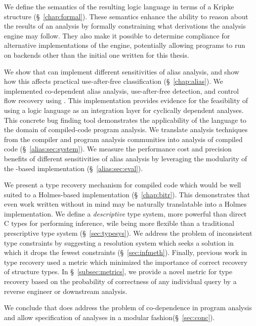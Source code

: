 We define the semantics of the resulting logic language in terms of a Kripke structure (\S~\ref{chap:formal}).
These semantics enhance the ability to reason about the results of an analysis by formally constraining what derivations the analysis engine may follow.
They also make it possible to determine compliance for alternative implementations of the engine, potentially allowing programs to run on backends other than the initial one written for this thesis.

We show that \sysname can implement different sensitivities of alias analysis, and show how this affects practical use-after-free classification (\S~\ref{chap:alias}).
We implemented co-dependent alias analysis, use-after-free detection, and control flow recovery using \sysname.
This implementation provides evidence for the feasibility of using a logic language as an integration layer for cyclically dependent analyses.
This concrete bug finding tool demonstrates the applicability of the \sysname language to the domain of compiled-code program analysis.
We translate analysis techniques from the compiler and program analysis communities into analysis of compiled code (\S~\ref{alias:sec:system}).
We measure the performance cost and precision benefits of different sensitivities of alias analysis by leveraging the modularity of the \sysname-based implementation (\S~\ref{alias:sec:eval}).

We present a type recovery mechanism for compiled code which would be well suited to a Holmes-based implementation (\S~\ref{chap:bitr}).
This demonstrates that even work written without \sysname in mind may be naturally translatable into a Holmes implementation.
We define a \emph{descriptive} type system, more powerful than direct C types for performing inference, wile being more flexible than a traditional prescriptive type system (\S~\ref{sec:typesys}).
We address the problem of inconsistent type constraints by suggesting a resolution system which seeks a solution in which it drops the fewest constraints (\S~\ref{sec:infmeth}).
Finally, previous work in type recovery used a metric which minimized the importance of correct recovery of structure types.
In \S~\ref{subsec:metrics}, we provide a novel metric for type recovery based on the probability of correctness of any individual query by a reverse engineer or downstream analysis.

We conclude that \sysname does address the problem of co-dependence in program analysis and allow specification of analyses in a modular fashion(\S~\ref{sec:conc}).
